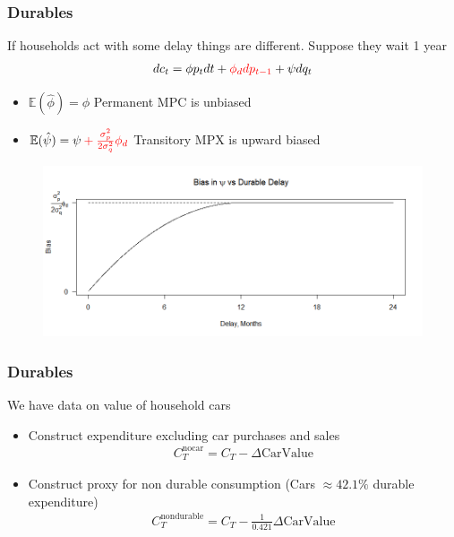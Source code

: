 \documentclass{beamer}
\begin{document}
{
	\frametitle{Durables}
	If households act with some delay things are different. Suppose they wait 1 year
	\begin{align*}
	dc_t = \phi p_t dt + \color{red} \phi_{d} dp_{t-1} \color{black} + \psi dq_t
	\end{align*}
	\begin{itemize}
		\item $\mathbb{E}(\hat{\phi})=\phi$ Permanent MPC is unbiased
		\item $\mathbb{E}(\hat{\psi})=\psi \color{red} + \frac{\sigma^2_p}{2\sigma^2_q}\phi_d$ Transitory MPX is upward biased
	\end{itemize}
	\begin{figure}
		\includegraphics[scale=0.3]{../Figures/DurableBias.png}
	\end{figure}
}
\frame
{
	\frametitle{Durables}
	We have data on value of household cars\\
	\begin{itemize}
		\item Construct expenditure excluding car purchases and sales
		\begin{align*}
		C_T^{\text{nocar}} = C_T - \Delta \text{CarValue}
		\end{align*}
		\item Construct proxy for non durable consumption (Cars $\approx 42.1\%$ durable expenditure)
		\begin{align*}
		C_T^{\text{nondurable}} = C_T - \frac{1}{0.421}\Delta \text{CarValue}
		\end{align*}
	\end{itemize}
}
\frame
\end{document}
